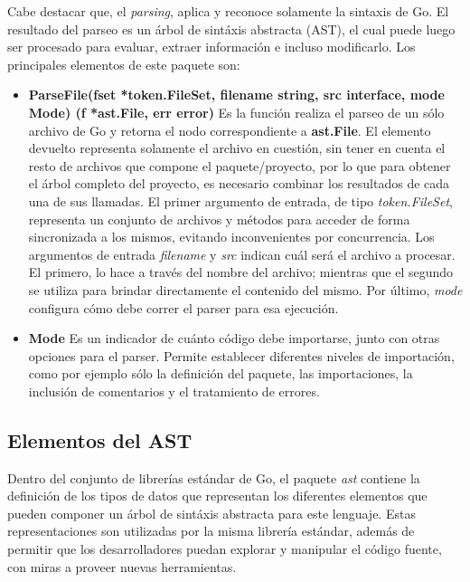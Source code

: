 \begin{itemize}
  Cabe destacar que, el \textit{parsing}, aplica y reconoce solamente la sintaxis de Go.
  El resultado del parseo es un árbol de sintáxis abstracta (AST), el cual puede luego ser procesado 
  para evaluar, extraer información e incluso modificarlo.
  Los principales elementos de este paquete son:
  \begin{itemize}
    \item \textbf{ParseFile(fset *token.FileSet, filename string, src interface{}, mode Mode) (f *ast.File, err error)} 
    Es la función realiza el parseo de un sólo archivo de Go y retorna el nodo correspondiente a \textbf{ast.File}.
    El elemento devuelto representa solamente el archivo en cuestión, sin tener en cuenta el resto de 
    archivos que compone el paquete/proyecto, por lo que para obtener el árbol completo del proyecto, 
    es necesario combinar los resultados de cada una de sus llamadas.
    El primer argumento de entrada, de tipo \textit{token.FileSet}, representa un conjunto de archivos 
    y métodos para acceder de forma sincronizada a los mismos, evitando inconvenientes por concurrencia.
    Los argumentos de entrada \textit{filename} y \textit{src} indican cuál será el archivo a procesar.
    El primero, lo hace a través del nombre del archivo; mientras que el segundo se utiliza para brindar 
    directamente el contenido del mismo.
    Por último, \textit{mode} configura cómo debe correr el parser para esa ejecución.
    \item \textbf{Mode} Es un indicador de cuánto código debe importarse, junto con otras opciones para el parser.
    Permite establecer diferentes niveles de importación, como por ejemplo sólo la definición del paquete, 
    las importaciones, la inclusión de comentarios y el tratamiento de errores.
  \end{itemize}
\end{itemize}

\subsection{Elementos del AST}

Dentro del conjunto de librerías estándar de Go, el paquete \textit{ast} contiene la definición de
los tipos de datos que representan los diferentes elementos que pueden componer un árbol de
sintáxis abstracta para este lenguaje.
Estas representaciones son utilizadas por la misma librería estándar, además de permitir
que los desarrolladores puedan explorar y manipular el código fuente, con miras a proveer nuevas
herramientas.

